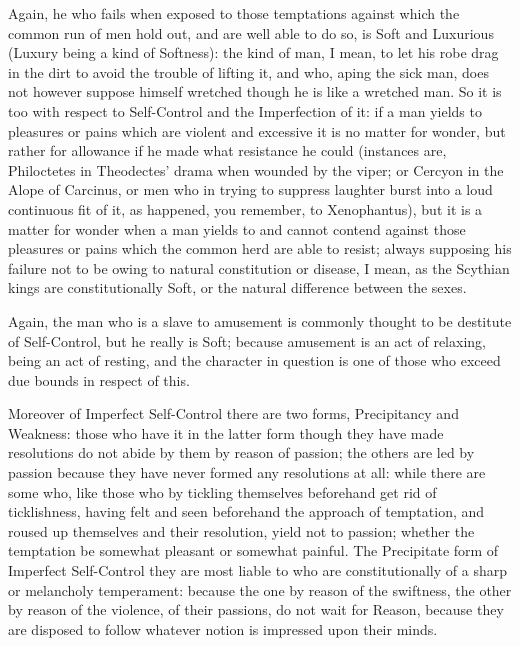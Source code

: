 Again, he who fails when exposed to those temptations against which the common
run of men hold out, and are well able to do so, is Soft and Luxurious (Luxury
being a kind of Softness): the kind of man, I mean, to let his robe drag in the
dirt to avoid the trouble of lifting it, and who, aping the sick man, does not
however suppose himself wretched though he is like a wretched man. So it is too
with respect to Self-Control and the Imperfection of it: if a man yields to
pleasures or pains which are violent and excessive it is no matter for wonder,
but rather for allowance if he made what resistance he could (instances are,
Philoctetes in Theodectes’ drama when wounded by the viper; or Cercyon in
the Alope of Carcinus, or men who in trying to suppress laughter burst into a
loud continuous fit of it, as happened, you remember, to Xenophantus), but it
is a matter for wonder when a man yields to and cannot contend against those
pleasures or pains which the common herd are able to resist; always supposing
his failure not to be owing to natural constitution or disease, I mean, as the
Scythian kings are constitutionally Soft, or the natural difference between the
sexes.

Again, the man who is a slave to amusement is commonly thought to be destitute
of Self-Control, but he really is Soft; because amusement is an act of
relaxing, being an act of resting, and the character in question is one of
those who exceed due bounds in respect of this.

Moreover of Imperfect Self-Control there are two forms, Precipitancy and
Weakness: those who have it in the latter form though they have made
resolutions do not abide by them by reason of passion; the others are led by
passion because they have never formed any resolutions at all: while there are
some who, like those who by tickling themselves beforehand get rid of
ticklishness, having felt and seen beforehand the approach of temptation, and
roused up themselves and their resolution, yield not to passion; whether the
temptation be somewhat pleasant or somewhat painful. The Precipitate form of
Imperfect Self-Control they are most liable to who are constitutionally of a
sharp or melancholy temperament: because the one by reason of the swiftness,
the other by reason of the violence, of their passions, do not wait for Reason,
because they are disposed to follow whatever notion is impressed upon their
minds.

